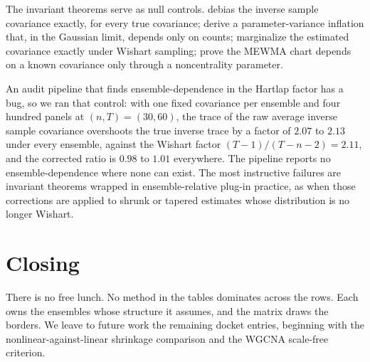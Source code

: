 \documentclass[11pt]{article}
\begin{document}
The invariant theorems serve as null controls. \citet{hartlap2007}
debias the inverse sample covariance exactly, for every
true covariance; \citet{dodelson2013} derive a
parameter-variance inflation that, in the Gaussian limit, depends only on
counts; \citet{sellentin2016} marginalize the estimated covariance exactly under
Wishart sampling; \citet{lowry1992} prove the MEWMA chart depends on
a known covariance only through a noncentrality parameter.

An audit pipeline that finds ensemble-dependence in the Hartlap factor
has a bug, so we ran that control: with one fixed covariance per ensemble and four
hundred panels at $(n,T)=(30,60)$, the trace of the raw average inverse
sample covariance overshoots the true inverse trace by a factor of
$2.07$ to $2.13$ under every ensemble, against the Wishart factor
$(T-1)/(T-n-2)=2.11$, and the corrected ratio is $0.98$ to $1.01$
everywhere. The pipeline reports no ensemble-dependence where none can
exist. The most instructive failures are invariant theorems wrapped in
ensemble-relative plug-in practice, as when those corrections are
applied to shrunk or tapered estimates whose distribution is no longer
Wishart.

\section{Closing}

There is no free lunch. No method in the tables dominates across the rows. Each owns the
ensembles whose structure it assumes, and the matrix draws the borders.
We leave to future work the remaining docket entries, beginning with
the nonlinear-against-linear shrinkage comparison and the WGCNA
scale-free criterion.



\end{document}
